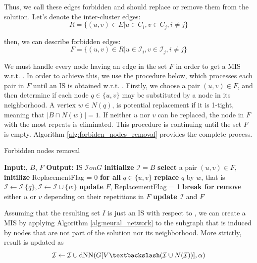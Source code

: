 Thus, we call these edges forbidden and should replace or remove them from the solution.
Let's denote the inter-cluster edges:
\begin{equation}
    R = \{(u,v)\in E | u \in C_i, v \in C_j, i\neq j\}
\end{equation}

then, we can describe forbidden edges:
\begin{equation}
    F = \{(u,v) \in R | u \in \mathcal{I}_i, v \in \mathcal{I}_j, i \neq j\}
\end{equation}

We must handle every node having an edge in the set $F$ in order to get a MIS w.r.t. \graphG. In order to achieve this, we use the procedure below, which processes each pair in $F$ until an IS is obtained w.r.t. \graphG. Firstly, we choose a pair $(u, v) \in F$, and then determine if each node $q \in \{u, v\}$ may be substituted by a node in its neighborhood. A vertex $w \in N(q)$, is potential replacement if it is 1-tight, meaning that $|B\cap N(w)| = 1$. If neither $u$ nor $v$ can be replaced, the node in $F$ with the most repeats is eliminated. This procedure is continuing until the set $F$ is empty. Algorithm \ref{alg:forbiden_nodes_removal} provides the complete process. 

\begin{algorithm}
\caption{Forbidden nodes removal}\label{alg:forbiden_nodes_removal}
\begin{algorithmic}
\State \textbf{Input:}\graphG, $B$, $F$
\State \textbf{Output:} IS $\mathcal{I} on G$
\State \textbf{initialize} $\mathcal{I} = B$
    \State \textbf{select} a pair $(u,v) \in F,$ \textbf{initilize} ReplacementFlag = 0
    \State \textbf{for all} $q \in \{u,v\}$
        \State \textbf{replace} $q$ by $w$, that is $\mathcal{I} \leftarrow \mathcal{I} \ \{q\}, \mathcal{I}\leftarrow \mathcal{I} \cup \{w\}$
        \State \textbf{update} $F$, ReplacementFlag = 1
        \State \textbf{break for}
    \EndIf
        \State \textbf{remove} either $u$ or $v$ depending on their repetitions in $F$
        \State \textbf{update} $\mathcal{I}$ and $F$
    \EndIf
\EndWhile
\end{algorithmic}
\end{algorithm}

Assuming that the resulting set $I$ is just an IS with respect to \graphG, we can create a MIS by applying Algorithm \ref{alg:neural_network} to the subgraph that is induced by nodes that are not part of the solution nor its neighborhood.
More strictly, result is updated as 
\begin{equation}
    \mathcal{I} \leftarrow \mathcal{I} \cup \text{dNN}(G[V\textbackslash(\mathcal{I} \cup N(\mathcal{I}))], \alpha)
\end{equation}

